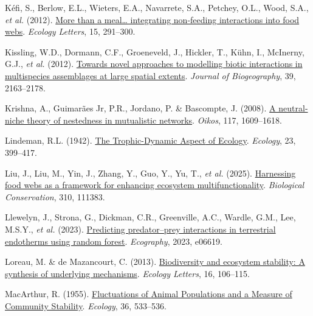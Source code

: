 \documentclass[
]{article}
\newlength{\cslhangindent}
\newenvironment{CSLReferences}[2] %
 {\begin{list}{}{%
  \setlength{\itemindent}{0pt}
  \setlength{\leftmargin}{0pt}
  \setlength{\parsep}{0pt}
  \ifodd #1
   \setlength{\leftmargin}{\cslhangindent}
   \setlength{\itemindent}{-1\cslhangindent}
  \fi
  \setlength{\itemsep}{#2\baselineskip}}}
 {\end{list}}
\begin{document}
\begin{CSLReferences}{1}{0}
Kéfi, S., Berlow, E.L., Wieters, E.A., Navarrete, S.A., Petchey, O.L.,
Wood, S.A., \emph{et al.} (2012).
\href{https://doi.org/10.1111/j.1461-0248.2011.01732.x}{More than a
meal\ldots{} integrating non-feeding interactions into food webs}.
\emph{Ecology Letters}, 15, 291--300.

Kissling, W.D., Dormann, C.F., Groeneveld, J., Hickler, T., Kühn, I.,
McInerny, G.J., \emph{et al.} (2012).
\href{https://doi.org/10.1111/j.1365-2699.2011.02663.x}{Towards novel
approaches to modelling biotic interactions in multispecies assemblages
at large spatial extents}. \emph{Journal of Biogeography}, 39,
2163--2178.

Krishna, A., Guimarães Jr, P.R., Jordano, P. \& Bascompte, J. (2008).
\href{https://doi.org/10.1111/j.1600-0706.2008.16540.x}{A neutral-niche
theory of nestedness in mutualistic networks}. \emph{Oikos}, 117,
1609--1618.

Lindeman, R.L. (1942). \href{https://doi.org/10.2307/1930126}{The
{Trophic-Dynamic Aspect} of {Ecology}}. \emph{Ecology}, 23, 399--417.

Liu, J., Liu, M., Yin, J., Zhang, Y., Guo, Y., Yu, T., \emph{et al.}
(2025). \href{https://doi.org/10.1016/j.biocon.2025.111383}{Harnessing
food webs as a framework for enhancing ecosystem multifunctionality}.
\emph{Biological Conservation}, 310, 111383.

Llewelyn, J., Strona, G., Dickman, C.R., Greenville, A.C., Wardle, G.M.,
Lee, M.S.Y., \emph{et al.} (2023).
\href{https://doi.org/10.1111/ecog.06619}{Predicting predator--prey
interactions in terrestrial endotherms using random forest}.
\emph{Ecography}, 2023, e06619.

Loreau, M. \& de Mazancourt, C. (2013).
\href{https://doi.org/10.1111/ele.12073}{Biodiversity and ecosystem
stability: A synthesis of underlying mechanisms}. \emph{Ecology
Letters}, 16, 106--115.

MacArthur, R. (1955).
\href{https://doi.org/10.2307/1929601}{Fluctuations of {Animal
Populations} and a {Measure} of {Community Stability}}. \emph{Ecology},
36, 533--536.


\end{CSLReferences}
\end{document}
